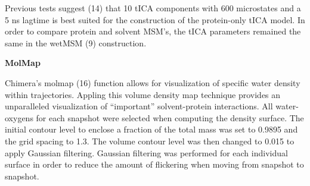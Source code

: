 Previous tests suggest (14) that 10 tICA components with 600 microstates
and a 5 ns lagtime is best suited for the construction of the
protein-only tICA model. In order to compare protein and solvent MSM's,
the tICA parameters remained the same in the wetMSM (9) construction.

\textbf{MolMap }

Chimera's molmap (16) function allows for visualization of specific
water density within trajectories. Appling this volume density map
technique provides an unparalleled visualization of ``important''
solvent-protein interactions. All water-oxygens for each snapshot were
selected when computing the density surface. The initial contour level
to enclose a fraction of the total mass was set to 0.9895 and the grid
spacing to 1.3. The volume contour level was then changed to 0.015 to
apply Gaussian filtering. Gaussian filtering was performed for each
individual surface in order to reduce the amount of flickering when
moving from snapshot to snapshot.



